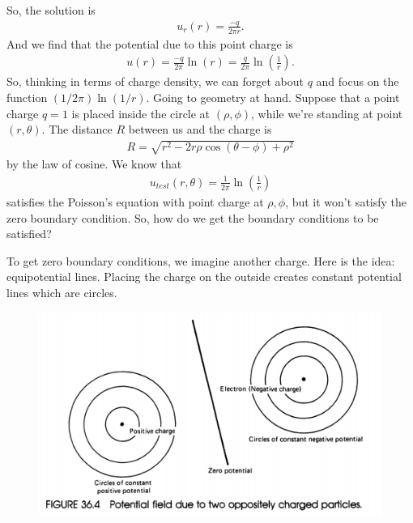 \documentclass{article}
\theoremstyle{definition}
\newcommand{\f}[2]{\frac{#1}{#2}}
\newcommand{\lp}{\left(}
\newcommand{\rp}{\right)}
\begin{document}
So, the solution is
\begin{align*}
u_r(r) = \f{-q}{2\pi r}.
\end{align*}
And we find that the potential due to this point charge is
\begin{align*}
u(r) = \f{-q}{2\pi}\ln(r) = \f{q}{2\pi}\ln\lp \f{1}{r} \rp.
\end{align*}
So, thinking in terms of charge density, we can forget about $q$ and focus on the function $(1/2\pi) \ln(1/r)$. Going to geometry at hand. Suppose that a point charge $q=1$ is placed inside the circle at $(\rho,\phi)$, while we're standing at point $(r,\theta)$. The distance $R$ between us and the charge is
\begin{align*}
R = \sqrt{r^2 - 2r\rho\cos(\theta-\phi) + \rho^2}
\end{align*} 
by the law of cosine. We know that
\begin{align*}
u_{test}(r,\theta) = \f{1}{2\pi}\ln\lp \f{1}{r}\rp
\end{align*}
satisfies the Poisson's equation with point charge at $\rho,\phi$, but it won't satisfy the zero boundary condition. So, how do we get the boundary conditions  to be satisfied? 

To get zero boundary conditions, we imagine another charge. Here is the idea: equipotential lines. Placing the charge on the outside creates constant potential lines which are circles. 

\begin{figure}[h!]
	\centering
	\includegraphics[scale=0.5]{charge.png}
\end{figure}
\end{document}

